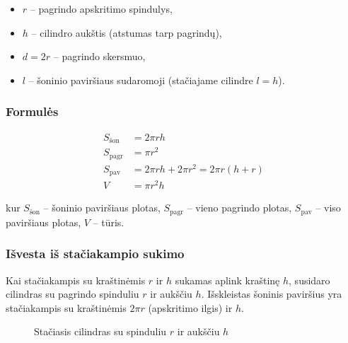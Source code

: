 \begin{itemize}
    \item $r$ – pagrindo apskritimo spindulys,
    \item $h$ – cilindro aukštis (atstumas tarp pagrindų),
    \item $d = 2r$ – pagrindo skersmuo,
    \item $l$ – šoninio paviršiaus sudaromoji (stačiajame cilindre $l = h$).
\end{itemize}

\subsubsection*{Formulės}

\begin{tcolorbox}[title=Cilindro formulės, colback=blue!5!white, colframe=blue!60!black]
\begin{align}
    S_{\text{šon}} &= 2\pi r h \\
    S_{\text{pagr}} &= \pi r^2 \\
    S_{\text{pav}} &= 2\pi r h + 2\pi r^2 = 2\pi r(h + r) \\
    V &= \pi r^2 h
\end{align}
\end{tcolorbox}

\noindent kur $S_{\text{šon}}$ – šoninio paviršiaus plotas, $S_{\text{pagr}}$ – vieno pagrindo plotas, $S_{\text{pav}}$ – viso paviršiaus plotas, $V$ – tūris.

\subsubsection*{Išvesta iš stačiakampio sukimo}

Kai stačiakampis su kraštinėmis $r$ ir $h$ sukamas aplink kraštinę $h$, susidaro cilindras su pagrindo spinduliu $r$ ir aukščiu $h$. Išskleistas šoninis paviršius yra stačiakampis su kraštinėmis $2\pi r$ (apskritimo ilgis) ir $h$.

\begin{figure}[h]
\centering
{}
\caption{Stačiasis cilindras su spinduliu $r$ ir aukščiu $h$}
\end{figure}

